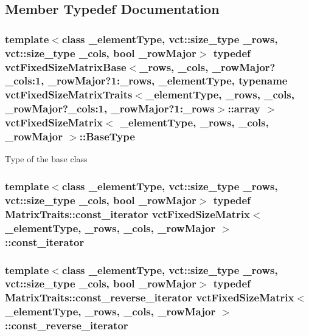 \subsection{Member Typedef Documentation}
\hypertarget{classvct_fixed_size_matrix_a9d96b338cbb52283cdb817b6b497feb5}{
\subsubsection[{Base\-Type}]{\setlength{\rightskip}{0pt plus 5cm}template$<$class \-\_\-element\-Type, vct\-::size\-\_\-type \-\_\-rows, vct\-::size\-\_\-type \-\_\-cols, bool \-\_\-row\-Major$>$ typedef {\bf vct\-Fixed\-Size\-Matrix\-Base}$<$\-\_\-rows, \-\_\-cols, \-\_\-row\-Major?\-\_\-cols\-:1, \-\_\-row\-Major?1\-:\-\_\-rows, \-\_\-element\-Type, typename {\bf vct\-Fixed\-Size\-Matrix\-Traits}$<$\-\_\-element\-Type, \-\_\-rows, \-\_\-cols, \-\_\-row\-Major?\-\_\-cols\-:1, \-\_\-row\-Major?1\-:\-\_\-rows$>$\-::array $>$ {\bf vct\-Fixed\-Size\-Matrix}$<$ \-\_\-element\-Type, \-\_\-rows, \-\_\-cols, \-\_\-row\-Major $>$\-::{\bf Base\-Type}}}\label{classvct_fixed_size_matrix_a9d96b338cbb52283cdb817b6b497feb5}
Type of the base class \hypertarget{classvct_fixed_size_matrix_a6f5d0f13f38c1ccc8f736e6d0d5c8fb3}{
\subsubsection[{const\-\_\-iterator}]{\setlength{\rightskip}{0pt plus 5cm}template$<$class \-\_\-element\-Type, vct\-::size\-\_\-type \-\_\-rows, vct\-::size\-\_\-type \-\_\-cols, bool \-\_\-row\-Major$>$ typedef {\bf Matrix\-Traits\-::const\-\_\-iterator} {\bf vct\-Fixed\-Size\-Matrix}$<$ \-\_\-element\-Type, \-\_\-rows, \-\_\-cols, \-\_\-row\-Major $>$\-::{\bf const\-\_\-iterator}}}\label{classvct_fixed_size_matrix_a6f5d0f13f38c1ccc8f736e6d0d5c8fb3}
\hypertarget{classvct_fixed_size_matrix_a0f130f24813be72cfe2c68af25f55c9a}{
\subsubsection[{const\-\_\-reverse\-\_\-iterator}]{\setlength{\rightskip}{0pt plus 5cm}template$<$class \-\_\-element\-Type, vct\-::size\-\_\-type \-\_\-rows, vct\-::size\-\_\-type \-\_\-cols, bool \-\_\-row\-Major$>$ typedef {\bf Matrix\-Traits\-::const\-\_\-reverse\-\_\-iterator} {\bf vct\-Fixed\-Size\-Matrix}$<$ \-\_\-element\-Type, \-\_\-rows, \-\_\-cols, \-\_\-row\-Major $>$\-::{\bf const\-\_\-reverse\-\_\-iterator}}}\label{classvct_fixed_size_matrix_a0f130f24813be72cfe2c68af25f55c9a}

